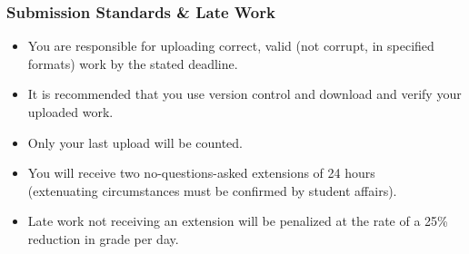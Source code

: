 \begin{frame}
  \frametitle{Submission Standards \& Late Work}

  \begin{itemize}
  \item You are responsible for uploading correct, valid (not corrupt, in specified formats) work by the stated deadline.
  \item It is recommended that you use \alert{version control} and \alert{download and verify} your uploaded work.
  \item Only your last upload will be counted.
  \item You will receive two no-questions-asked extensions of 24 hours\\
    (extenuating circumstances must be confirmed by student affairs).
  \item Late work not receiving an extension will be penalized at the rate of a 25\% reduction in grade per day.
  \end{itemize}
  
\end{frame}
